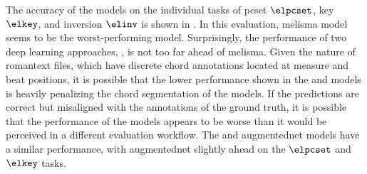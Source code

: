 

The accuracy of the models on the individual tasks of
\gls{pcset} $\elpcset$, key $\elkey$, and inversion $\elinv$
is shown in . In this evaluation,
\gls{melisma} model seems to be the worst-performing model.
Surprisingly, the performance of two deep learning
approaches, \textcite{mcleod2021modular,chen2021attend}, is
not too far ahead of \gls{melisma}. Given the nature of
\gls{romantext} files, which have discrete chord annotations
located at measure and beat positions, it is possible that
the lower performance shown in the
\textcite{mcleod2021modular} and \textcite{chen2021attend}
models is heavily penalizing the chord segmentation of the
models. If the predictions are correct but misaligned with
the annotations of the ground truth, it is possible that the
performance of the models appears to be worse than it would
be perceived in a different evaluation workflow. The
\textcite{micchi2021deep} and \gls{augmentednet} models have
a similar performance, with \gls{augmentednet} slightly
ahead on the $\elpcset$ and $\elkey$ tasks.

